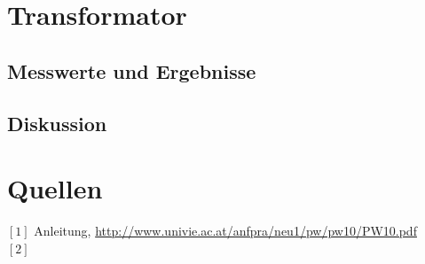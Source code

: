 \documentclass[12pt,a4paper]{article}
\begin{document}
\begin{multicols}{2}
\section{Transformator}



\subsection{Messwerte und Ergebnisse}



\subsection{Diskussion}







\section{Quellen}
$[1]$ Anleitung, \url{http://www.univie.ac.at/anfpra/neu1/pw/pw10/PW10.pdf}\\
$[2]$ 
\end{multicols}
\end{document}
